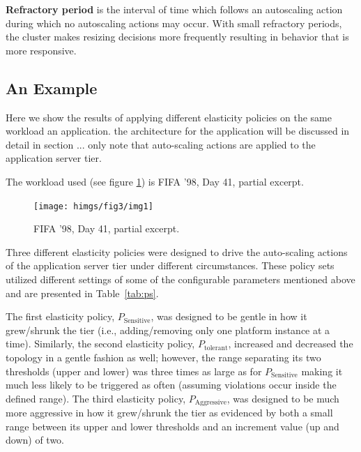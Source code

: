 \textbf{Refractory period} is the interval of time which follows an autoscaling action during which no autoscaling actions may occur.  
With small refractory periods, the cluster makes resizing decisions more frequently resulting in behavior that is more responsive. 
%
%


\subsection{An Example} 
Here we show the results of applying different elasticity policies on the same workload an application. the architecture for the application will be discussed in detail in section ... only note that  auto-scaling actions are applied to the application server tier.

The workload used (see figure \ref{fig:scenario_workload}) is FIFA '98, Day 41, partial excerpt.  
 \begin{figure}
   \centering
    \label{fig:workload41partial}\texttt{[image: himgs/fig3/img1]}
    \caption{FIFA '98, Day 41, partial excerpt.}
		\label{fig:scenario_workload}
 \end{figure} 
	
 Three different elasticity policies were designed to drive the auto-scaling actions of the application server tier under different circumstances. These policy sets utilized different settings of some of the configurable parameters mentioned above and are presented in Table~\ref{tab:ps}.   %
 
  The first elasticity policy, $P_\text{Sensitive}$, was designed to be gentle in how it grew/shrunk the tier (i.e., adding/removing only one platform instance at a time).  %
Similarly, the second elasticity policy, $P_\text{tolerant}$, increased and decreased the topology in a gentle fashion as well; however, the range separating its two thresholds (upper and lower) was three times as large as for $P_\text{Sensitive}$ making it much less likely to be triggered as often (assuming violations occur inside the defined range). 
The third elasticity policy, $P_\text{Aggressive}$, was designed to be much more aggressive in how it grew/shrunk the tier as evidenced by both a small range between its upper and lower thresholds and an increment value (up and down) of two.  %
 
